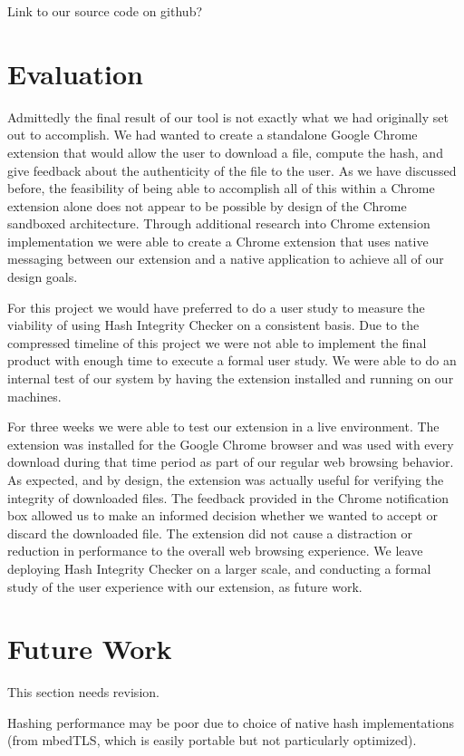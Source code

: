 \documentclass[letterpaper,twocolumn,10pt]{article}
\begin{document}
Link to our source code on github?

\section{Evaluation}
Admittedly the final result of our tool is not exactly what we had originally set out to accomplish. We had wanted to create a standalone Google Chrome extension that would allow the user to download a file, compute the hash, and give feedback about the authenticity of the file to the user. As we have discussed before, the feasibility of being able to accomplish all of this within a Chrome extension alone does not appear to be possible by design of the Chrome sandboxed architecture. Through additional research into Chrome extension implementation we were able to create a Chrome extension that uses native messaging between our extension and a native application to achieve all of our design goals.

For this project we would have preferred to do a user study to measure the viability of using Hash Integrity Checker on a consistent basis. Due to the compressed timeline of this project we were not able to implement the final product with enough time to execute a formal user study. We were able to do an internal test of our system by having the extension installed and running on our machines.

For three weeks we were able to test our extension in a live environment. The extension was installed for the Google Chrome browser and was used with every download during that time period as part of our regular web browsing behavior. As expected, and by design, the extension was actually useful for verifying the integrity of downloaded files. The feedback provided in the Chrome notification box allowed us to make an informed decision whether we wanted to accept or discard the downloaded file. The extension did not cause a distraction or reduction in performance to the overall web browsing experience. We leave deploying Hash Integrity Checker on a larger scale, and conducting a formal study of the user experience with our extension, as future work.

\section{Future Work}

This section needs revision.

Hashing performance may be poor due to choice of native hash implementations (from mbedTLS, which is easily portable but not particularly optimized).
\end{document}
